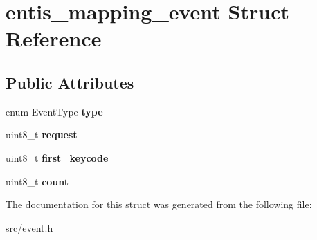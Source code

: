 \hypertarget{structentis__mapping__event}{}\section{entis\+\_\+mapping\+\_\+event Struct Reference}
\label{structentis__mapping__event}
\subsection*{Public Attributes}
\begin{DoxyCompactItemize}
\item 
\mbox{\label{structentis__mapping__event_a6eb2526cdfb9e89ddd15617244ce44a9}} 
enum Event\+Type {\bfseries type}
\item 
\mbox{\label{structentis__mapping__event_a5f506a2800f189cacc375a625340f979}} 
uint8\+\_\+t {\bfseries request}
\item 
\mbox{\label{structentis__mapping__event_aa67bc39b4b1bdd6e45b1a4eae2a41a52}} 
uint8\+\_\+t {\bfseries first\+\_\+keycode}
\item 
\mbox{\label{structentis__mapping__event_a8d222c7d47f97bbcf48eef5a386ebcd0}} 
uint8\+\_\+t {\bfseries count}
\end{DoxyCompactItemize}


The documentation for this struct was generated from the following file\+:\begin{DoxyCompactItemize}
\item 
src/event.\+h\end{DoxyCompactItemize}
